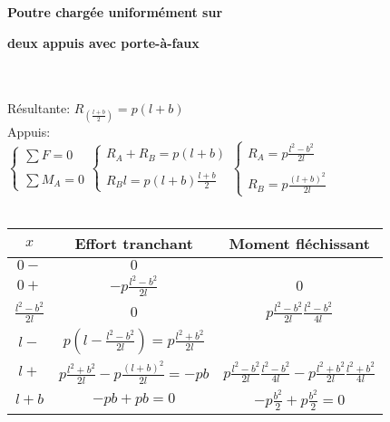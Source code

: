 \documentclass[a4paper]{article}
\begin{document}
\begin{minipage}{9cm}
\centerline{\textbf{Poutre chargée uniformément sur}}
\centerline{\textbf{deux appuis avec porte-à-faux}}
~\\
~\\
Résultante: $R_{(\frac{l + b}{2})} = p(l + b)$\\
Appuis:\\
$\begin{cases}
\sum{F} = 0\\
~\\
\sum{M_A} = 0
\end{cases}
\begin{cases}
R_A + R_B = p(l + b)\\
~\\
R_Bl = p(l + b)\frac{l + b}{2}
\end{cases}
\begin{cases}
R_A = p\frac{l^2 - b^2}{2l}\\
~\\
R_B = p\frac{(l + b)^2}{2l}
\end{cases}$
~\\
~\\
\small
\begin{tabular}{|c|c|c|}\hline
$x$&
Effort tranchant&
Moment fléchissant\\
\hline
$0-$&
$0$&
\\
\hline
$0+$&
$-p\frac{l^2 - b^2}{2l}$&
$0$\\
\hline
$\frac{l^2 - b^2}{2l}$&
$0$&
$p\frac{l^2 - b^2}{2l}\frac{l^2 - b^2}{4l}$\\
\hline
$l-$&
$p(l - \frac{l^2 - b^2}{2l}) = p\frac{l^2 + b^2}{2l}$&
\\
\hline
$l+$&
$p\frac{l^2 + b^2}{2l} - p\frac{(l + b)^2}{2l} = -pb$&
$p\frac{l^2 - b^2}{2l}\frac{l^2 - b^2}{4l} -
 p\frac{l^2 + b^2}{2l}\frac{l^2 + b^2}{4l}$\\
\hline
$l + b$&
$-pb + pb = 0$&
$-p\frac{b^2}{2} + p\frac{b^2}{2} = 0$\\
\hline
\end{tabular}
\normalsize
\end{minipage}
\end{document}
